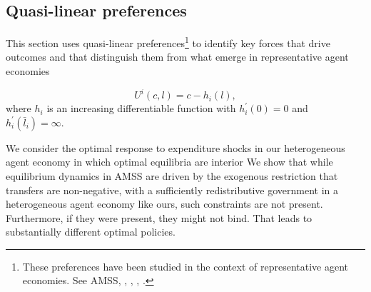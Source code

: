 \documentclass[thmsb,11pt]{article}
\begin{document}
\subsection{Quasi-linear preferences\label{Sec: quasilinear}}

\smallskip
This section uses quasi-linear preferences\footnote{These preferences have been studied in
the context of representative
agent economies.
See  AMSS, \cite{Farhi2010}, \cite{Battaglini2007,Battaglini2008}, \cite{Yared2012}, \cite{Faraglia2011}.} to identify
key forces that drive outcomes and that  distinguish them from what emerge in  representative agent economies

\begin{equation}
U^{i}\left( c,l\right) =c-h_{i}(l),  \label{quasilinear}
\end{equation}%
where $h_{i}$ is an increasing differentiable function with $h_{i}^{\prime
}\left( 0\right) =0$ and $h_{i}^{\prime }\left( \bar{l}_{i}\right) =\infty $.

We consider the optimal response to expenditure shocks in our heterogeneous agent
economy in which optimal equilibria are interior %
We show that while  equilibrium dynamics in AMSS are
driven by the exogenous restriction that transfers are non-negative,  with a sufficiently redistributive government in
a heterogeneous agent economy  like ours, such
constraints are not present. Furthermore, if they were present, they might not bind.  That leads to substantially different  optimal policies.
\end{document}
